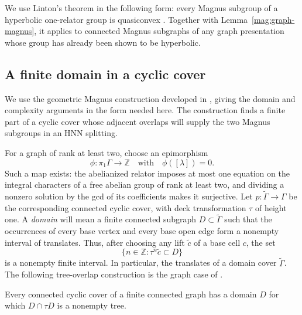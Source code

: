 We use Linton's theorem in the following form:
every Magnus subgroup of a hyperbolic one-relator group is
quasiconvex \cite[Theorem~4.7]{LintonHyperbolic2026}.
Together with Lemma~\ref{mag:graph-magnus}, it applies to connected
Magnus subgraphs of any graph presentation whose group has already
been shown to be hyperbolic.

\subsection{A finite domain in a cyclic cover}

We use the geometric Magnus construction developed in
\cite[Section~4]{LintonHierarchies2025}, giving the domain and
complexity arguments in the form needed here.  The construction
finds a finite part of a cyclic cover whose adjacent overlaps
will supply the two Magnus subgroups in an HNN splitting.

For a graph of rank at least two, choose an epimorphism
\[
 \phi\colon\pi_1\Gamma\longrightarrow\mathbb Z
 \quad\text{with}\quad\phi([\lambda])=0.
\]
Such a map exists: the abelianized relator imposes at most one
equation on the integral characters of a free abelian group of
rank at least two, and dividing a nonzero solution by the gcd of
its coefficients makes it surjective.
Let $p\colon\widetilde\Gamma\to\Gamma$ be the corresponding
connected cyclic cover, with deck transformation $\tau$ of height
one.  A \emph{domain} will mean a finite connected subgraph
$D\subset\widetilde\Gamma$ such that the occurrences of every
base vertex and every base open edge form a nonempty interval of
translates.  Thus, after choosing any lift $\widetilde c$ of a base cell $c$, the
set
\[
 \{n\in\mathbb Z:\tau^n\widetilde c\subset D\}
\]
is a nonempty finite interval.  In particular, the translates of
a domain cover $\widetilde\Gamma$.  The following tree-overlap
construction is the graph case of
\cite[Lemma~4.7]{LintonHierarchies2025}.

\begin{lemma}\label{mag:tree-domain}
Every connected cyclic cover of a finite connected graph has a
domain $D$ for which $D\cap\tau D$ is a nonempty tree.
\end{lemma}

